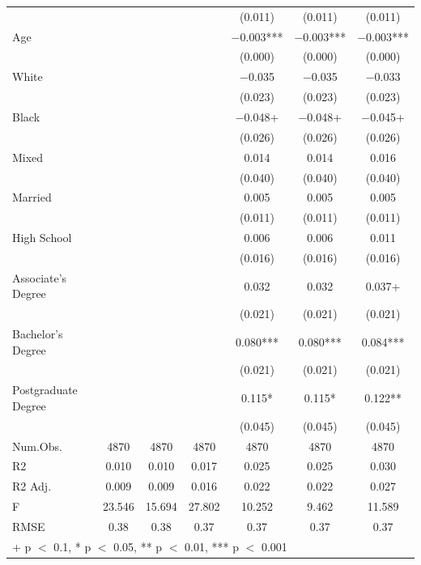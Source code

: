 \documentclass[
]{article}
\begin{document}
\begin{table}
{\begin{tabular}[t]{lcccccc}
 &  &  &  & (\num{0.011}) & (\num{0.011}) & \vphantom{1} (\num{0.011})\\
Age &  &  &  & \num{-0.003}*** & \num{-0.003}*** & \num{-0.003}***\\
 &  &  &  & (\num{0.000}) & (\num{0.000}) & (\num{0.000})\\
White &  &  &  & \num{-0.035} & \num{-0.035} & \num{-0.033}\\
 &  &  &  & (\num{0.023}) & (\num{0.023}) & (\num{0.023})\\
Black &  &  &  & \num{-0.048}+ & \num{-0.048}+ & \num{-0.045}+\\
 &  &  &  & (\num{0.026}) & (\num{0.026}) & (\num{0.026})\\
Mixed &  &  &  & \num{0.014} & \num{0.014} & \num{0.016}\\
 &  &  &  & (\num{0.040}) & (\num{0.040}) & (\num{0.040})\\
Married &  &  &  & \num{0.005} & \num{0.005} & \num{0.005}\\
 &  &  &  & (\num{0.011}) & (\num{0.011}) & (\num{0.011})\\
High
School &  &  &  & \num{0.006} & \num{0.006} & \num{0.011}\\
 &  &  &  & (\num{0.016}) & (\num{0.016}) & (\num{0.016})\\
Associate's
Degree &  &  &  & \num{0.032} & \num{0.032} & \num{0.037}+\\
 &  &  &  & (\num{0.021}) & (\num{0.021}) & \vphantom{1} (\num{0.021})\\
Bachelor's
Degree &  &  &  & \num{0.080}*** & \num{0.080}*** & \num{0.084}***\\
 &  &  &  & (\num{0.021}) & (\num{0.021}) & (\num{0.021})\\
Postgraduate
Degree &  &  &  & \num{0.115}* & \num{0.115}* & \num{0.122}**\\
 &  &  &  & (\num{0.045}) & (\num{0.045}) & (\num{0.045})\\
\midrule
Num.Obs. & \num{4870} & \num{4870} & \num{4870} & \num{4870} & \num{4870} & \num{4870}\\
R2 & \num{0.010} & \num{0.010} & \num{0.017} & \num{0.025} & \num{0.025} & \num{0.030}\\
R2 Adj. & \num{0.009} & \num{0.009} & \num{0.016} & \num{0.022} & \num{0.022} & \num{0.027}\\
F & \num{23.546} & \num{15.694} & \num{27.802} & \num{10.252} & \num{9.462} & \num{11.589}\\
RMSE & \num{0.38} & \num{0.38} & \num{0.37} & \num{0.37} & \num{0.37} & \num{0.37}\\
\bottomrule
\multicolumn{7}{l}{\rule{0pt}{1em}+ p $<$ 0.1, * p $<$ 0.05, ** p $<$ 0.01, *** p $<$ 0.001}\\
\end{tabular}}
\end{table}
\end{document}
